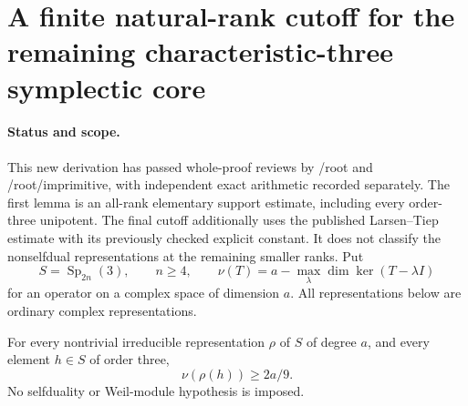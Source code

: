 \section{A finite natural-rank cutoff for the remaining characteristic-three symplectic core}
\label{sec:symplectic-three-cutoff}

\paragraph{Status and scope.}
This new derivation has passed whole-proof reviews by /root and
/root/imprimitive, with independent exact arithmetic recorded separately.
The first
lemma is an all-rank elementary support estimate, including every
order-three unipotent. The final cutoff additionally uses the published
Larsen--Tiep estimate with its previously checked explicit constant.
It does not classify the nonselfdual representations at the remaining
smaller ranks. Put
\[
 S=\operatorname{Sp}_{2n}(3),\qquad n\ge4,\qquad
 \nu(T)=a-\max_\lambda\dim\ker(T-\lambda I)
 \tag{HOS3C.1}
\]
for an operator on a complex space of dimension $a$.
All representations below are ordinary complex representations.

\begin{lemma}
\label{D-HOS-13}
For every nontrivial irreducible representation $\rho$ of $S$ of
degree $a$, and every element $h\in S$ of order three,
\[
                         \nu(\rho(h))\ge2a/9.
 \tag{HOS3C.2}
\]
No selfduality or Weil-module hypothesis is imposed.
\end{lemma}

